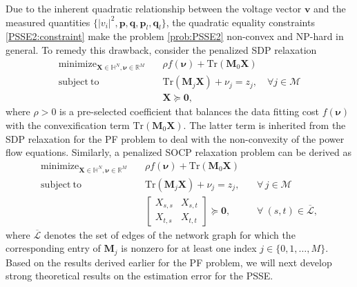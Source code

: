 \documentclass[journal,twoside]{IEEEtran}
\newcommand{\Tr}{\mathrm{Tr}}
\newcommand{\st}{\mathrm{subject~to}}
\newcommand{\bp}{\mathbf{p}}
\newcommand{\bq}{\mathbf{q}}
\newcommand{\bv}{\mathbf{v}}
\newcommand{\bM}{\mathbf{M}}
\newcommand{\bX}{\mathbf{X}}
\newcommand{\bSigma}{\bm{\Sigma}}
\newcommand{\bnu}{\bm{\nu}}
\newcommand{\bmeta}{\bm{\eta}}
\newcommand{\cL}{{\mathcal L}}
\newcommand{\cM}{{\mathcal M}}
\DeclareMathOperator*{\argmin}{arg\,min}
\DeclareMathOperator*{\mini}{\mathrm{minimize}}
\begin{document}

Due to the inherent quadratic relationship between the voltage vector $\bv$ and the measured quantities $\{|v_i|^2,\bp,\bq,\bp_l,\bq_l\}$, the
quadratic equality constraints \eqref{PSSE2:constraint} make the problem \eqref{prob:PSSE2}
non-convex and NP-hard in general. To remedy this drawback, consider the penalized SDP relaxation
\begin{subequations}\label{PSSE-SDPP}
\begin{align}
\mini_{\bX \in \mathbb{H}^N, \bnu \in \mathbb{R}^M}\quad & \rho f(\bnu)+\Tr(\bM_0\bX) \\
\st\quad  &\Tr(\bM_j\bX)+\nu_j = z_j,\quad \forall j\in \cM \\
\quad & \bX \succeq \mathbf{0},
\end{align}
\end{subequations}
where $\rho>0$ is a pre-selected coefficient that balances the data fitting cost $f(\bnu)$ with the convexification term
$\Tr(\bM_0\bX)$.  The latter term is inherited from the SDP relaxation for the PF problem to deal with the non-convexity of the power flow equations. Similarly, a penalized  SOCP relaxation problem can be derived as
\begin{subequations}\label{PSSE-SOCP}
	\begin{align}
	\mini_{\bX \in \mathbb{H}^N, \bnu \in \mathbb{R}^M}\quad &\rho f(\bnu)+\Tr(\bM_0\bX) \label{PSSE-SOCP:obj} \\
	\st\quad  &\Tr(\bM_j\bX)+\nu_j = z_j,\, &&\forall\, j\in \cM \label{PSSE-SOCP:meq} \\
	\quad &
	\begin{bmatrix}
	X_{s,s} & X_{s,t}\\
	X_{t,s} &X_{t,t}
	\end{bmatrix}
	\succeq  \mathbf{0}, &&\forall~(s,t) \in \overline\cL,\label{PSSE-SOCP:cone}
	\end{align}
\end{subequations}
where $\overline \cL$ denotes the set of edges of the network graph for which
the corresponding entry of $\mathbf{M}_{j}$ is nonzero for at least one index $j \in \{0,1,\ldots,M\}$.
Based on the results derived earlier for  the PF problem,
we will next develop strong theoretical results on the estimation error for the PSSE.
\end{document}
